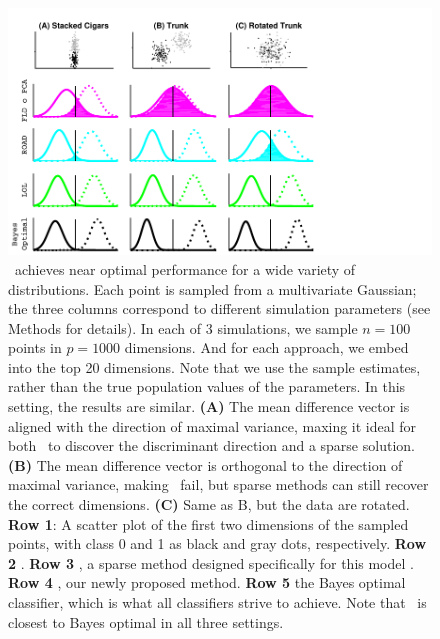 \documentclass[10pt]{article}
\begin{document}
\begin{figure}%
\centering
\includegraphics[width=0.8\linewidth,trim=0in 0in 1.5in 0in,clip=true]{../Figs/cigars_est}%
\caption{
\Lol~achieves near optimal performance for a wide variety of distributions.
Each point is sampled from a multivariate Gaussian;
the three columns correspond to different simulation parameters (see Methods for details).
In each of 3 simulations, we sample $n=100$ points in $p=1000$ dimensions.  And for each approach, we embed into the top 20 dimensions. Note that we use the sample estimates, rather than the true population values of the parameters.  In this setting, the results are  similar.
\textbf{(A)} The mean difference vector is aligned with the direction of maximal variance, maxing it ideal for both \Pca~to discover the discriminant direction and a sparse solution.
\textbf{(B)} The mean difference vector is orthogonal to the direction of maximal variance, making \Pca~fail, but sparse methods can still recover the correct dimensions.
\textbf{(C)} Same as B, but the data are rotated.
\textbf{Row 1}: A scatter plot of the first two dimensions of the sampled points, with class 0 and 1 as black and gray dots, respectively.
\textbf{Row 2} .
\textbf{Row 3} \Road, a sparse method designed specifically for this model \cite{Fan2012a}.
\textbf{Row 4} \Lol, our newly proposed method.
\textbf{Row 5} the Bayes optimal classifier, which is what all classifiers strive to achieve.
Note that \Lol~is closest to Bayes optimal in all three settings.
}
\label{f:cigars}
\end{figure}
\end{document}
